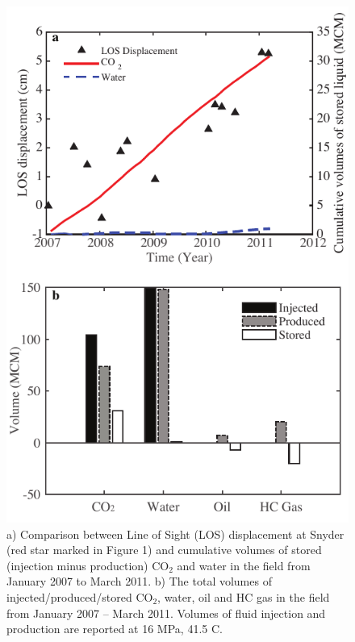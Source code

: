 \clearpage
\begin{figure}
	\centering
	\includegraphics{figs_paper3/Fig4.pdf}	
	\caption{a) Comparison between Line of Sight (LOS) displacement at Snyder (red star marked in Figure 1) and cumulative volumes of stored (injection minus production) CO$_{2}$ and water in the field from January 2007 to March 2011.  b) The total volumes of injected/produced/stored CO$_{2}$, water, oil and HC gas in the field from January 2007 – March 2011.  Volumes of fluid injection and production are reported at 16 MPa, 41.5 \textordmasculine C.}
	\label{fig:los_cumul_store}
\end{figure}

